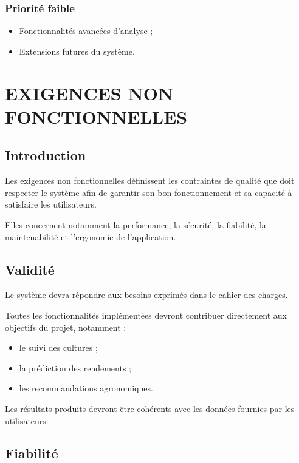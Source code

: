 \documentclass[12pt,a4paper]{report}
\begin{document}
\subsection{Priorité faible}\label{priorituxe9-faible}

\begin{itemize}
\item
  Fonctionnalités avancées d'analyse ;
\item
  Extensions futures du système.
\end{itemize}

\chapter{EXIGENCES NON
FONCTIONNELLES}\label{chapitre-5-exigences-non-fonctionnelles}

\section{Introduction}\label{introduction-1}

Les exigences non fonctionnelles définissent les contraintes de qualité
que doit respecter le système afin de garantir son bon fonctionnement et
sa capacité à satisfaire les utilisateurs.

Elles concernent notamment la performance, la sécurité, la fiabilité, la
maintenabilité et l'ergonomie de l'application.

\section{Validité}\label{validituxe9}

Le système devra répondre aux besoins exprimés dans le cahier des
charges.

Toutes les fonctionnalités implémentées devront contribuer directement
aux objectifs du projet, notamment :

\begin{itemize}
\item
  le suivi des cultures ;
\item
  la prédiction des rendements ;
\item
  les recommandations agronomiques.
\end{itemize}

Les résultats produits devront être cohérents avec les données fournies
par les utilisateurs.

\section{Fiabilité}\label{fiabilituxe9}
\end{document}
